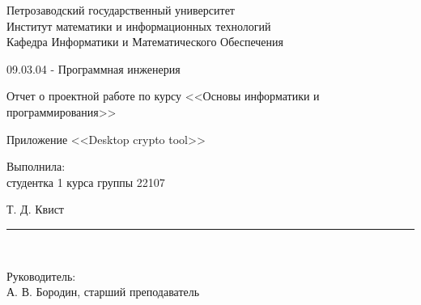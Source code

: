 \documentclass[a4paper,12pt]{article}
\newcommand{\myrule}[1]{\rule{#1}{0.4pt}}
\newcommand{\sign}[2][~]{{\small\myrule{#2}\\[-0.7em]\makebox[#2]{\it #1}}}
\renewcommand{\baselinestretch}{1.50}
\begin{document}

\thispagestyle{empty}
\begin{center}


\renewcommand{\baselinestretch}{1}
{\large
{\sc Петрозаводский государственный университет\\
Институт математики и информационных технологий\\
	Кафедра Информатики и Математического Обеспечения
}
}

\end{center}


\begin{center}
%
%
09.03.04 - Программная инженерия \\
%
% 
\end{center}

\vfill

\begin{center}
{\normalsize Отчет о проектной работе по курсу <<Основы информатики и программирования>>} \\

\medskip

	{\Large \sc Приложение <<Desktop crypto tool>>} \\
\end{center}

\medskip

\begin{flushright}
\parbox{11cm}{%
\renewcommand{\baselinestretch}{1.2}
\normalsize
	Выполнила:\\
студентка 1 курса группы 22107
\begin{flushright}
	Т. Д. Квист \sign[подпись]{4cm}
\end{flushright}

Руководитель:\\
А. В. Бородин, старший преподаватель \\

}
\end{flushright}
\end{document}
